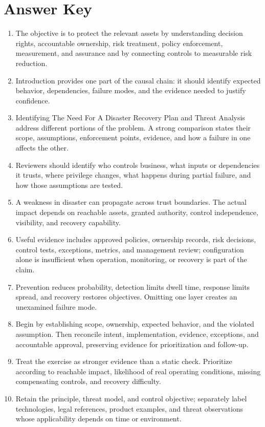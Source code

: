 \documentclass[11pt]{article}
\begin{document}
\section*{Answer Key}
\begin{enumerate}
\item The objective is to protect the relevant assets by understanding decision rights, accountable ownership, risk treatment, policy enforcement, measurement, and assurance and by connecting controls to measurable risk reduction.
\item Introduction provides one part of the causal chain: it should identify expected behavior, dependencies, failure modes, and the evidence needed to justify confidence.
\item Identifying The Need For A Disaster Recovery Plan and Threat Analysis address different portions of the problem. A strong comparison states their scope, assumptions, enforcement points, evidence, and how a failure in one affects the other.
\item Reviewers should identify who controls business, what inputs or dependencies it trusts, where privilege changes, what happens during partial failure, and how those assumptions are tested.
\item A weakness in disaster can propagate across trust boundaries. The actual impact depends on reachable assets, granted authority, control independence, visibility, and recovery capability.
\item Useful evidence includes approved policies, ownership records, risk decisions, control tests, exceptions, metrics, and management review; configuration alone is insufficient when operation, monitoring, or recovery is part of the claim.
\item Prevention reduces probability, detection limits dwell time, response limits spread, and recovery restores objectives. Omitting one layer creates an unexamined failure mode.
\item Begin by establishing scope, ownership, expected behavior, and the violated assumption. Then reconcile intent, implementation, evidence, exceptions, and accountable approval, preserving evidence for prioritization and follow-up.
\item Treat the exercise as stronger evidence than a static check. Prioritize according to reachable impact, likelihood of real operating conditions, missing compensating controls, and recovery difficulty.
\item Retain the principle, threat model, and control objective; separately label technologies, legal references, product examples, and threat observations whose applicability depends on time or environment.
\end{enumerate}
\end{document}
